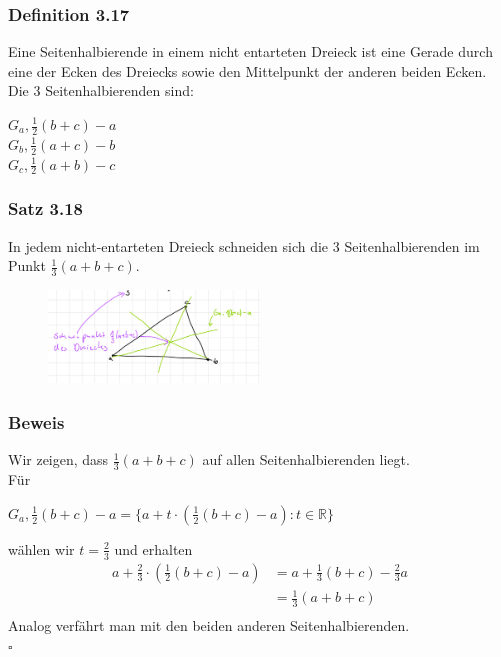 \documentclass{article}
\begin{document}
\subsubsection*{Definition 3.17}
Eine Seitenhalbierende in einem nicht entarteten Dreieck ist eine Gerade durch eine der Ecken des Dreiecks sowie den Mittelpunkt der anderen beiden Ecken. \\
Die 3 Seitenhalbierenden sind: \\
\begin{center}
    $G_a,\frac{1}{2}(b+c)-a$ \\
    $G_b,\frac{1}{2}(a+c)-b$ \\
    $G_c,\frac{1}{2}(a+b)-c$ \\
\end{center}

\subsubsection*{Satz 3.18}
In jedem nicht-entarteten Dreieck schneiden sich die 3 Seitenhalbierenden im Punkt $\frac{1}{3}(a+b+c)$. \\
\begin{figure}[h]
    \centering
    \includegraphics[width=0.5\textwidth]{Images/3.18.jpeg}

\end{figure}

\subsubsection*{Beweis}
Wir zeigen, dass $\frac{1}{3}(a+b+c)$ auf allen Seitenhalbierenden liegt. \\
Für \\
\begin{center}
    $G_a, \frac{1}{2}(b+c)-a = \{a+t \cdot (\frac{1}{2}(b+c)-a): t \in \mathbb{R}\}$ \\
\end{center}
wählen wir $t = \frac{2}{3}$ und erhalten \\
\begin{align*}
    a + \frac{2}{3} \cdot (\frac{1}{2}(b+c)-a) &= a + \frac{1}{3}(b+c) - \frac{2}{3}a \\
    &= \frac{1}{3}(a+b+c)\\
\end{align*}
Analog verfährt man mit den beiden anderen Seitenhalbierenden. \\
$\square$ \\
\\
\end{document}
